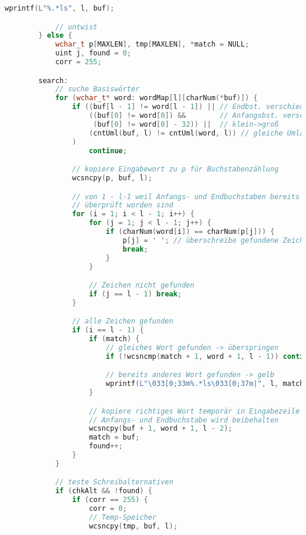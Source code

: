 \documentclass[a4paper,10pt,ngerman]{scrartcl}
\begin{document}
\begin{lstlisting}[language=C++]
            wprintf(L"%.*ls", l, buf);

            // untwist
        } else {
            wchar_t p[MAXLEN], tmp[MAXLEN], *match = NULL;
            uint j, found = 0;
            corr = 255;

        search:
            // suche Basiswörter
            for (wchar_t* word: wordMap[l][charNum(*buf)]) {
                if ((buf[l - 1] != word[l - 1]) || // Endbst. verschieden
                    ((buf[0] != word[0]) &&        // Anfangsbst. verschieden
                     (buf[0] != word[0] - 32)) ||  // klein->groß
                    (cntUml(buf, l) != cntUml(word, l)) // gleiche Umlautzahl
                )
                    continue;

                // kopiere Eingabewort zu p für Buchstabenzählung
                wcsncpy(p, buf, l);

                // von 1 - l-1 weil Anfangs- und Endbuchstaben bereits
                // überprüft worden sind
                for (i = 1; i < l - 1; i++) {
                    for (j = 1; j < l - 1; j++) {
                        if (charNum(word[i]) == charNum(p[j])) {
                            p[j] = ' '; // überschreibe gefundene Zeichen
                            break;
                        }
                    }

                    // Zeichen nicht gefunden
                    if (j == l - 1) break;
                }

                // alle Zeichen gefunden
                if (i == l - 1) {
                    if (match) {
                        // gleiches Wort gefunden -> überspringen
                        if (!wcsncmp(match + 1, word + 1, l - 1)) continue;

                        // bereits anderes Wort gefunden -> gelb
                        wprintf(L"\033[0;33m%.*ls\033[0;37m|", l, match);
                    }

                    // kopiere richtiges Wort temporär in Eingabezeile
                    // Anfangs- und Endbuchstabe wird beibehalten
                    wcsncpy(buf + 1, word + 1, l - 2);
                    match = buf;
                    found++;
                }
            }

            // teste Schreibalternativen
            if (chkAlt && !found) {
                if (corr == 255) {
                    corr = 0;
                    // Temp-Speicher
                    wcsncpy(tmp, buf, l);


\end{lstlisting}
\end{document}

